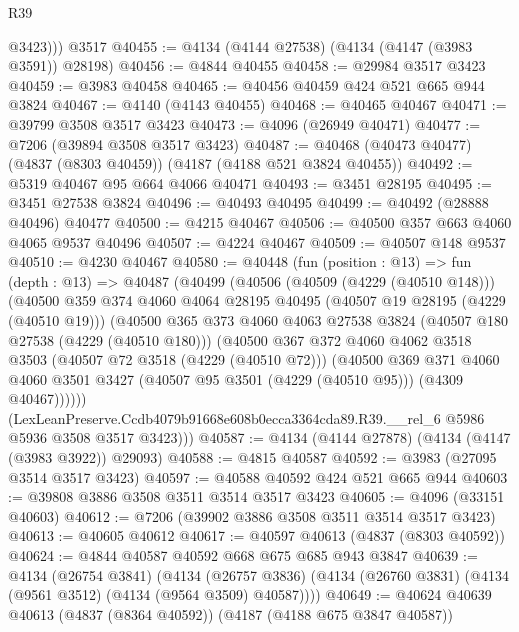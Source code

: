 \begin{lexlean}{R39}
\begin{coremodule}
          @3423)))
    @3517
@40455 := @4134 (@4144 @27538) (@4134 (@4147 (@3983 @3591)) @28198)
@40456 := @4844 @40455
@40458 := @29984 @3517 @3423
@40459 := @3983 @40458
@40465 := @40456 @40459 @424 @521 @665 @944 @3824
@40467 := @4140 (@4143 @40455)
@40468 := @40465 @40467
@40471 := @39799 @3508 @3517 @3423
@40473 := @4096 (@26949 @40471)
@40477 := @7206 (@39894 @3508 @3517 @3423)
@40487 := @40468 (@40473 @40477) (@4837 (@8303 @40459)) (@4187 (@4188 @521 @3824 @40455))
@40492 := @5319 @40467 @95 @664 @4066 @40471
@40493 := @3451 @28195
@40495 := @3451 @27538 @3824
@40496 := @40493 @40495
@40499 := @40492 (@28888 @40496) @40477
@40500 := @4215 @40467
@40506 := @40500 @357 @663 @4060 @4065 @9537 @40496
@40507 := @4224 @40467
@40509 := @40507 @148 @9537
@40510 := @4230 @40467
@40580 := @40448
    (fun (position : @13) =>
    fun (depth : @13) =>
    @40487
      (@40499
        (@40506
          (@40509 (@4229 (@40510 @148)))
          (@40500
            @359
            @374
            @4060
            @4064
            @28195
            @40495
            (@40507 @19 @28195 (@4229 (@40510 @19)))
            (@40500
              @365
              @373
              @4060
              @4063
              @27538
              @3824
              (@40507 @180 @27538 (@4229 (@40510 @180)))
              (@40500
                @367
                @372
                @4060
                @4062
                @3518
                @3503
                (@40507 @72 @3518 (@4229 (@40510 @72)))
                (@40500
                  @369
                  @371
                  @4060
                  @4060
                  @3501
                  @3427
                  (@40507 @95 @3501 (@4229 (@40510 @95)))
                  (@4309 @40467))))))
        (LexLeanPreserve.Ccdb4079b91668e608b0ecca3364cda89.R39.__rel_6
          @5986
          @5936
          @3508
          @3517
          @3423)))
@40587 := @4134 (@4144 @27878) (@4134 (@4147 (@3983 @3922)) @29093)
@40588 := @4815 @40587
@40592 := @3983 (@27095 @3514 @3517 @3423)
@40597 := @40588 @40592 @424 @521 @665 @944
@40603 := @39808 @3886 @3508 @3511 @3514 @3517 @3423
@40605 := @4096 (@33151 @40603)
@40612 := @7206 (@39902 @3886 @3508 @3511 @3514 @3517 @3423)
@40613 := @40605 @40612
@40617 := @40597 @40613 (@4837 (@8303 @40592))
@40624 := @4844 @40587 @40592 @668 @675 @685 @943 @3847
@40639 := @4134
    (@26754 @3841)
    (@4134 (@26757 @3836) (@4134 (@26760 @3831) (@4134 (@9561 @3512) (@4134 (@9564 @3509) @40587))))
@40649 := @40624 @40639 @40613 (@4837 (@8364 @40592)) (@4187 (@4188 @675 @3847 @40587))

\end{coremodule}
\end{lexlean}
